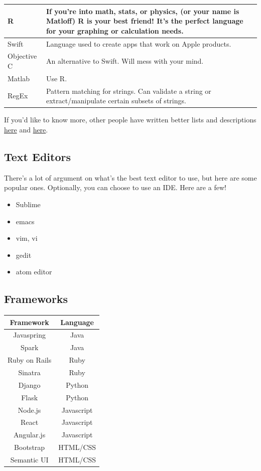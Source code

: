 \documentclass{article}
\begin{document}
\begin{center}
\begin{tabular} {|p{3cm} |p{8cm}|}
\hline
R & If you're into math, stats, or physics, (or your name is Matloff) R is your best friend! It's the perfect language for your graphing or calculation needs.\\
\hline
Swift & Language used to create apps that work on Apple products.\\
\hline
Objective C & An alternative to Swift. Will mess with your mind.\\
\hline
Matlab & Use R.\\
\hline
RegEx & Pattern matching for strings. Can validate a string or extract/manipulate certain subsets of strings.\\
\hline
\end{tabular}
\end{center}
\hspace{0.5cm} If you'd like to know more, other people have written better lists and descriptions  \href{https://www.quora.com/What-are-the-pros-and-cons-and-uses-of-the-major-programming-languages}{here} and \href{https://www.quora.com/What-are-the-pros-and-cons-and-uses-of-the-major-programming-languages}{here}. 
\subsection{Text Editors}
\hspace{0.5cm}There's a lot of argument on what's the best text editor to use, but here are some popular ones. Optionally, you can choose to use an IDE. Here are a few! 
\begin{itemize}
    \item Sublime 
    \item emacs
    \item vim, vi
    \item gedit 
    \item atom editor
\end{itemize}
\subsection{Frameworks}
\begin{tabular}{|c|c|}
\hline
\textbf{Framework} & \textbf{Language} \\
\hline
Javaspring & Java  \\
\hline
Spark & Java  \\
\hline
Ruby on Rails & Ruby  \\
\hline
Sinatra & Ruby \\
\hline
Django & Python  \\
\hline
Flask & Python  \\
\hline
Node.js & Javascript  \\
\hline
React & Javascript  \\
\hline
Angular.js & Javascript  \\
\hline
Bootstrap & HTML/CSS  \\
\hline
Semantic UI & HTML/CSS \\
\hline
\end{tabular}
\end{document}
